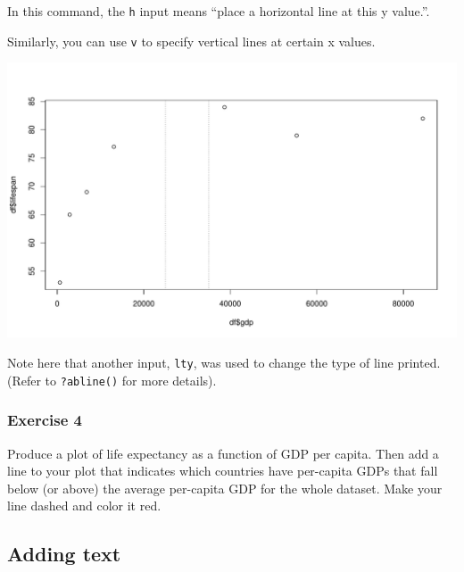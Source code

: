 \documentclass[
]{book}
\newenvironment{Shaded}{\begin{snugshade}}{\end{snugshade}}
\newcommand{\DataTypeTok}[1]{\textcolor[rgb]{0.13,0.29,0.53}{#1}}
\newcommand{\DecValTok}[1]{\textcolor[rgb]{0.00,0.00,0.81}{#1}}
\newcommand{\KeywordTok}[1]{\textcolor[rgb]{0.13,0.29,0.53}{\textbf{#1}}}
\newcommand{\NormalTok}[1]{#1}
\newcommand{\OperatorTok}[1]{\textcolor[rgb]{0.81,0.36,0.00}{\textbf{#1}}}
\newcommand{\StringTok}[1]{\textcolor[rgb]{0.31,0.60,0.02}{#1}}
\begin{document}
In this command, the \texttt{h} input means ``place a horizontal line at this y value.''.

Similarly, you can use \texttt{v} to specify vertical lines at certain x values.

\begin{Shaded}
\end{Shaded}

\includegraphics{figures/unnamed-chunk-121-1.pdf}

Note here that another input, \texttt{lty}, was used to change the type of line printed. (Refer to \texttt{?abline()} for more details).

\hypertarget{exercise-4-1}{%
\subsubsection*{Exercise 4}\label{exercise-4-1}}

Produce a plot of life expectancy as a function of GDP per capita. Then add a line to your plot that indicates which countries have per-capita GDPs that fall below (or above) the average per-capita GDP for the whole dataset. Make your line dashed and color it red.

\hypertarget{adding-text}{%
\subsection*{Adding text}\label{adding-text}}
\end{document}

